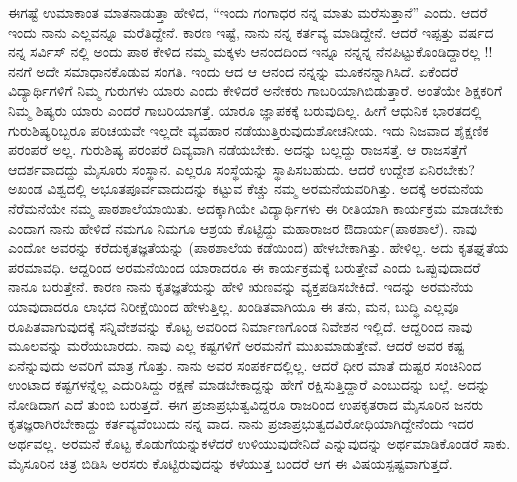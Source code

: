 {ಈಗಷ್ಟೆ ಉಮಾಕಾಂತ ಮಾತನಾಡುತ್ತಾ ಹೇಳಿದ, “ಇಂದು ಗಂಗಾಧರ ನನ್ನ ಮಾತು ಮರೆಸುತ್ತಾನೆ” ಎಂದು. ಆದರೆ ಇಂದು ನಾನು ಎಲ್ಲವನ್ನೂ ಮರೆತಿದ್ದೇನೆ. ಕಾರಣ ಇಷ್ಟೆ, ನಾನು ನನ್ನ ಕರ್ತವ್ಯ ಮಾಡಿದ್ದೇನೆ. ಆದರೆ ಇಪ್ಪತ್ತು ವರ್ಷದ ನನ್ನ ಸರ್ವಿಸ್ ನಲ್ಲಿ ಅಂದು ಪಾಠ ಕೇಳಿದ ನಮ್ಮ ಮಕ್ಕಳು ಆನಂದದಿಂದ ಇನ್ನೂ ನನ್ನನ್ನ ನೆನಪಿಟ್ಟುಕೊಂಡಿದ್ದಾರಲ್ಲ !! ನನಗೆ ಅದೇ ಸಮಾಧಾನಕೊಡುವ ಸಂಗತಿ. ಇಂದು ಆದ ಆ ಆನಂದ ನನ್ನನ್ನು ಮೂಕನನ್ನಾಗಿಸಿದೆ. ಏಕೆಂದರೆ ವಿದ್ಯಾರ್ಥಿಗಳಿಗೆ ನಿಮ್ಮ ಗುರುಗಳು ಯಾರು ಎಂದು ಕೇಳಿದರೆ ಅನೇಕರು ಗಾಬರಿಯಾಗಿಬಿಡುತ್ತಾರೆ. ಅಂತೆಯೇ ಶಿಕ್ಷಕರಿಗೆ ನಿಮ್ಮ ಶಿಷ್ಯರು ಯಾರು ಎಂದರೆ ಗಾಬರಿಯಾಗತ್ತೆ. ಯಾರೂ ಜ್ಞಾಪಕಕ್ಕೆ ಬರುವುದಿಲ್ಲ. ಹೀಗೆ ಆಧುನಿಕ ಭಾರತ\-ದಲ್ಲಿ ಗುರುಶಿಷ್ಯರಿಬ್ಬರೂ ಪರಿಚಯವೇ ಇಲ್ಲದೇ ವ್ಯವಹಾರ ನಡೆಯುತ್ತಿರುವುದು\break ಶೋಚನೀಯ. ಇದು ನಿಜವಾದ ಶೈಕ್ಷಣಿಕ ಪರಂಪರೆ ಅಲ್ಲ. ಗುರುಶಿಷ್ಯ ಪರಂಪರೆ ದಿವ್ಯ\-ವಾಗಿ ನಡೆಯಬೇಕು. ಅದನ್ನು ಬಲ್ಲದ್ದು ರಾಜಸತ್ತೆ. ಆ ರಾಜಸತ್ತೆಗೆ ಆದರ್ಶ\-ವಾದದ್ದು ಮೈಸೂರು ಸಂಸ್ಥಾನ. ಎಲ್ಲರೂ ಸಂಸ್ಥೆಯನ್ನು ಸ್ಥಾಪಿಸಬಹುದು. ಆದರೆ ಉದ್ದೇಶ ಏನಿರ\-ಬೇಕು? ಅಖಂಡ ವಿಶ್ವದಲ್ಲಿ ಅಭೂತಪೂರ್ವವಾದುದನ್ನು ಕಟ್ಟುವ ಕೆಚ್ಚು ನಮ್ಮ ಅರಮನೆ\-ಯವರಿಗಿತ್ತು. ಅದಕ್ಕೆ  ಅರಮನೆಯ ನೆರೆಮನೆಯೇ ನಮ್ಮ ಪಾಠಶಾಲೆ\-ಯಾಯಿತು. ಅದಕ್ಕಾಗಿಯೇ ವಿದ್ಯಾರ್ಥಿಗಳು ಈ ರೀತಿಯಾಗಿ ಕಾರ್ಯಕ್ರಮ ಮಾಡಬೇಕು ಎಂದಾಗ ನಾನು ಹೇಳಿದೆ \enginline{-} ನಮಗೂ ನಿಮಗೂ ಆಶ್ರಯ ಕೊಟ್ಟಿದ್ದು ಮಹಾರಾಜರ ಔದಾರ್ಯ(ಪಾಠಶಾಲೆ). ನಾವು ಎಂದೋ ಅವರನ್ನು ಕರೆದು\break ಕೃತಜ್ಞತೆಯನ್ನು (ಪಾಠಶಾಲೆಯ ಕಡೆಯಿಂದ) ಹೇಳಬೇಕಾಗಿತ್ತು. ಹೇಳಿಲ್ಲ. ಅದು ಕೃತಘ್ನತೆಯ ಪರಮಾವಧಿ. ಆದ್ದರಿಂದ ಅರಮನೆಯಿಂದ ಯಾರಾದರೂ ಈ ಕಾರ್ಯಕ್ರಮಕ್ಕೆ ಬರುತ್ತೇವೆ ಎಂದು ಒಪ್ಪುವುದಾದರೆ ನಾನೂ ಬರುತ್ತೇನೆ. ಕಾರಣ ನಾನು ಕೃತಜ್ಞತೆಯನ್ನು ಹೇಳಿ ಋಣವನ್ನು ವ್ಯಕ್ತಪಡಿಸಬೇಕಿದೆ. ಇದನ್ನು \hbox{ಅರಮನೆಯ} ಯಾವುದಾದರೂ ಲಾಭದ ನಿರೀಕ್ಷೆಯಿಂದ ಹೇಳುತ್ತಿಲ್ಲ. ಖಂಡಿತವಾಗಿಯೂ ಈ ತನು, ಮನ, ಬುದ್ಧಿ ಎಲ್ಲವೂ ರೂಪಿತವಾಗುವುದಕ್ಕೆ ಸನ್ನಿವೇಶವನ್ನು ಕೊಟ್ಟ ಅವರಿಂದ ನಿರ್ಮಾಣಗೊಂಡ ನಿವೇಶನ ಇಲ್ಲಿದೆ. ಆದ್ದರಿಂದ ನಾವು ಮೂಲವನ್ನು ಮರೆಯ\-ಬಾರದು. ನಾವು ಎಲ್ಲ ಕಷ್ಟಗಳಿಗೆ ಅರಮನೆಗೆ ಮುಖಮಾಡುತ್ತೇವೆ. ಆದರೆ ಅವರ ಕಷ್ಟ ಏನೆನ್ನುವುದು ಅವರಿಗೆ ಮಾತ್ರ ಗೊತ್ತು. ನಾನು ಅವರ ಸಂಪರ್ಕದಲ್ಲಿಲ್ಲ. ಆದರೆ ಧೀರ ಮಾತೆ ದುಷ್ಟರ ಸಂಚಿನಿಂದ ಉಂಟಾದ ಕಷ್ಟಗಳನ್ನೆಲ್ಲ ಎದುರಿಸಿದ್ದು  ರಕ್ಷಣೆ ಮಾಡಬೇಕಾದ್ದನ್ನು ಹೇಗೆ ರಕ್ಷಿಸುತ್ತಿದ್ದಾರೆ ಎಂಬುದನ್ನು ಬಲ್ಲೆ. ಅದನ್ನು ನೋಡಿದಾಗ ಎದೆ ತುಂಬಿ ಬರುತ್ತದೆ. ಈಗ ಪ್ರಜಾಪ್ರಭುತ್ವವಿದ್ದರೂ ರಾಜರಿಂದ ಉಪಕೃತರಾದ  ಮೈಸೂರಿನ ಜನರು ಕೃತಜ್ಞರಾಗಿರಬೇಕಾದ್ದು ಕರ್ತವ್ಯವೆಂಬುದು ನನ್ನ ವಾದ. ನಾನು ಪ್ರಜಾಪ್ರಭುತ್ವದ\break ವಿರೋಧಿಯಾಗಿದ್ದೇನೆಂದು  ಇದರ ಅರ್ಥವಲ್ಲ. ಅರಮನೆ ಕೊಟ್ಟ ಕೊಡುಗೆಯನ್ನು\break ಕಳೆದರೆ ಉಳಿಯುವುದೇನಿದೆ ಎನ್ನುವುದನ್ನು  ಅರ್ಥಮಾಡಿಕೊಂಡರೆ ಸಾಕು. ಮೈಸೂರಿನ ಚಿತ್ರ ಬಿಡಿಸಿ ಅರಸರು ಕೊಟ್ಟಿರುವುದನ್ನು ಕಳೆಯುತ್ತ ಬಂದರೆ ಆಗ ಈ ವಿಷಯ\break ಸ್ಪಷ್ಟ\-ವಾಗುತ್ತದೆ. 

}
